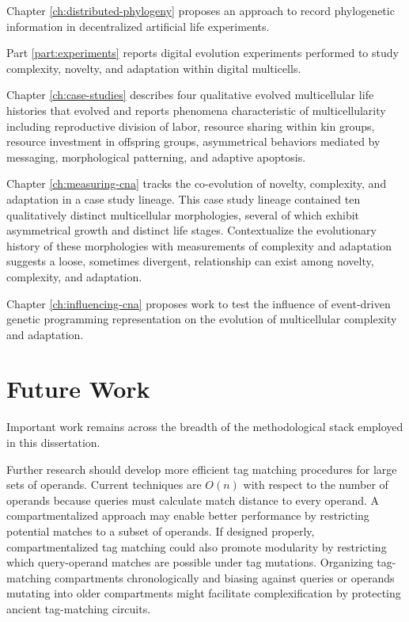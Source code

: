 Chapter \ref{ch:distributed-phylogeny} proposes an approach to record phylogenetic information in decentralized artificial life experiments.

Part \ref{part:experiments} reports digital evolution experiments performed to study complexity, novelty, and adaptation within digital multicells.

Chapter \ref{ch:case-studies} describes four qualitative evolved multicellular life histories that evolved and reports phenomena characteristic of multicellularity including reproductive division of labor, resource sharing within kin groups, resource investment in offspring groups, asymmetrical behaviors mediated by messaging, morphological patterning, and adaptive apoptosis.

Chapter \ref{ch:measuring-cna} tracks the co-evolution of novelty, complexity, and adaptation in a case study lineage.
This case study lineage contained ten qualitatively distinct multicellular morphologies, several of which exhibit asymmetrical growth and distinct life stages.
Contextualize the evolutionary history of these morphologies with measurements of complexity and adaptation suggests a loose, sometimes divergent, relationship can exist among novelty, complexity, and adaptation.

Chapter \ref{ch:influencing-cna} proposes work to test the influence of event-driven genetic programming representation on the evolution of multicellular complexity and adaptation.


\section{Future Work}

Important work remains across the breadth of the methodological stack employed in this dissertation.

Further research should develop more efficient tag matching procedures for large sets of operands.
Current techniques are $O(n)$ with respect to the number of operands because queries must calculate match distance to every operand.
A compartmentalized approach may enable better performance by restricting potential matches to a subset of operands.
If designed properly, compartmentalized tag matching could also promote modularity by restricting which query-operand matches are possible under tag mutations.
Organizing tag-matching compartments chronologically and biasing against queries or operands mutating into older compartments might facilitate complexification by protecting ancient tag-matching circuits.

